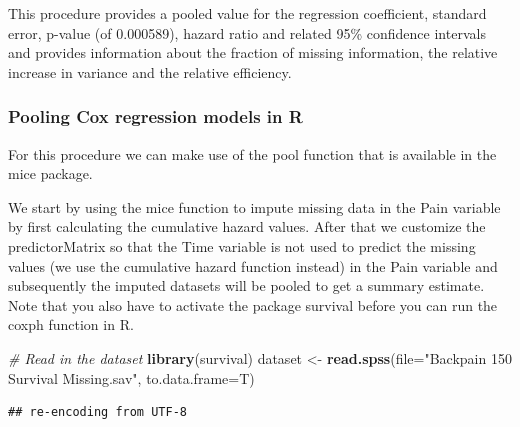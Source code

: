 \documentclass[]{book}
\newenvironment{Shaded}{\begin{snugshade}}{\end{snugshade}}
\newcommand{\KeywordTok}[1]{\textcolor[rgb]{0.13,0.29,0.53}{\textbf{#1}}}
\newcommand{\DataTypeTok}[1]{\textcolor[rgb]{0.13,0.29,0.53}{#1}}
\newcommand{\DecValTok}[1]{\textcolor[rgb]{0.00,0.00,0.81}{#1}}
\newcommand{\StringTok}[1]{\textcolor[rgb]{0.31,0.60,0.02}{#1}}
\newcommand{\CommentTok}[1]{\textcolor[rgb]{0.56,0.35,0.01}{\textit{#1}}}
\newcommand{\OperatorTok}[1]{\textcolor[rgb]{0.81,0.36,0.00}{\textbf{#1}}}
\newcommand{\NormalTok}[1]{#1}
\theoremstyle{definition}
\theoremstyle{definition}
\theoremstyle{definition}
\theoremstyle{remark}
\begin{document}
This procedure provides a pooled value for the regression coefficient,
standard error, p-value (of 0.000589), hazard ratio and related 95\%
confidence intervals and provides information about the fraction of
missing information, the relative increase in variance and the relative
efficiency.

\subsubsection{Pooling Cox regression models in
R}\label{pooling-cox-regression-models-in-r}

For this procedure we can make use of the pool function that is
available in the mice package.

We start by using the mice function to impute missing data in the Pain
variable by first calculating the cumulative hazard values. After that
we customize the predictorMatrix so that the Time variable is not used
to predict the missing values (we use the cumulative hazard function
instead) in the Pain variable and subsequently the imputed datasets will
be pooled to get a summary estimate. Note that you also have to activate
the package survival before you can run the coxph function in R.

\begin{Shaded}
\begin{Highlighting}[]
\CommentTok{# Read in the dataset}
\KeywordTok{library}\NormalTok{(survival)}
\NormalTok{dataset <-}\StringTok{ }\KeywordTok{read.spss}\NormalTok{(}\DataTypeTok{file=}\StringTok{"Backpain 150 Survival Missing.sav"}\NormalTok{, }\DataTypeTok{to.data.frame=}\NormalTok{T)}
\end{Highlighting}
\end{Shaded}

\begin{verbatim}
## re-encoding from UTF-8
\end{verbatim}

\begin{Shaded}
\end{Shaded}
\end{document}
